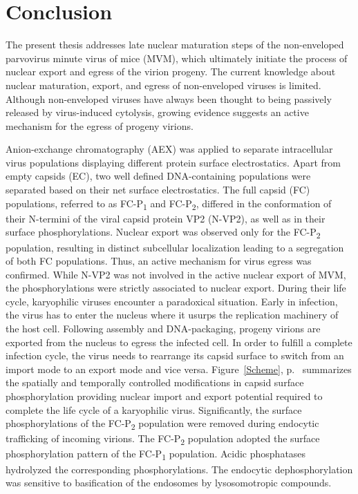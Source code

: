 
\chapter{Conclusion} %

\label{Conclusion} %


\graphicspath{{./Pictures/}}


The present thesis addresses late nuclear maturation steps of the non-enveloped parvovirus minute virus of mice (MVM), which ultimately initiate the process of nuclear export and egress of the virion progeny. The current knowledge about nuclear maturation, export, and egress of non-enveloped viruses is limited. Although non-enveloped viruses have always been thought to being passively released by virus-induced cytolysis, growing evidence suggests an active mechanism for the egress of progeny virions.   

Anion-exchange chromatography (AEX) was applied to separate intracellular virus populations displaying different protein surface electrostatics. Apart from empty capsids (EC), two well defined DNA-containing populations were separated based on their net surface electrostatics. The full capsid (FC) populations, referred to as FC-P\textsubscript{1} and FC-P\textsubscript{2}, differed in the conformation of their N-termini of the viral capsid protein VP2 (N-VP2), as well as in their surface phosphorylations. Nuclear export was observed only for the FC-P\textsubscript{2} population, resulting in distinct subcellular localization leading to a segregation of both FC populations. Thus, an active mechanism for virus egress was confirmed. While N-VP2 was not involved in the active nuclear export of MVM, the phosphorylations were strictly associated to nuclear export. During their life cycle, karyophilic viruses encounter a paradoxical situation. Early in infection, the virus has to enter the nucleus where it usurps the replication machinery of the host cell. Following assembly and DNA-packaging, progeny virions are exported from the nucleus to egress the infected cell. In order to fulfill a complete infection cycle, the virus needs to rearrange its capsid surface to switch from an import mode to an export mode and vice versa. Figure~\ref{Scheme}, p.~\pageref{Scheme} summarizes the spatially and temporally controlled modifications in capsid surface phosphorylation providing nuclear import and export potential required to complete the life cycle of a karyophilic virus. Significantly, the surface phosphorylations of the FC-P\textsubscript{2} population were removed during endocytic trafficking of incoming virions. The FC-P\textsubscript{2} population adopted the surface phosphorylation pattern of the FC-P\textsubscript{1} population. Acidic phosphatases hydrolyzed the corresponding phosphorylations. The endocytic dephosphorylation was sensitive to basification of the endosomes by lysosomotropic compounds.

